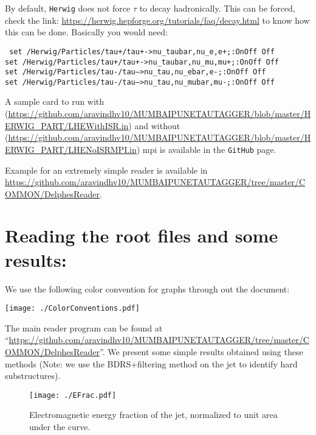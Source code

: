 By default, {\tt Herwig} does not force $\tau$ to decay hadronically. This can be forced, check the link: \url{https://herwig.hepforge.org/tutorials/faq/decay.html} to know how this can be done. Basically you would need:
\begin{center}
    \begin{minipage}{0.8\textwidth}
        {\tt
            set /Herwig/Particles/tau+/tau+->nu\_taubar,nu\_e,e+;:OnOff Off\\
            set /Herwig/Particles/tau+/tau+->nu\_taubar,nu\_mu,mu+;:OnOff Off\\
            set /Herwig/Particles/tau-/tau-->nu\_tau,nu\_ebar,e-;:OnOff Off\\
            set /Herwig/Particles/tau-/tau-->nu\_tau,nu\_mubar,mu-;:OnOff Off
        }
    \end{minipage}
\end{center}

A sample card to run with (\url{https://github.com/aravindhv10/MUMBAIPUNETAUTAGGER/blob/master/HERWIG_PART/LHEWithISR.in}) and without (\url{https://github.com/aravindhv10/MUMBAIPUNETAUTAGGER/blob/master/HERWIG_PART/LHENoISRMPI.in}) mpi is available in the {\tt GitHub} page.

Example for an extremely simple reader is available in \url{https://github.com/aravindhv10/MUMBAIPUNETAUTAGGER/tree/master/COMMON/DelphesReader}.



\section{Reading the root files and some results:}

We use the following color convention for graphs through out the document:
\begin{center}
    \texttt{[image: ./ColorConventions.pdf]}
\end{center}
The main reader program can be found at ``\url{https://github.com/aravindhv10/MUMBAIPUNETAUTAGGER/tree/master/COMMON/DelphesReader}''.
We present some simple results obtained using these methods (Note: we use the BDRS+filtering method on the jet to identify hard substructures).

\begin{figure}
    \begin{center}
        \texttt{[image: ./EFrac.pdf]}
        \caption{ Electromagnetic energy fraction of the jet, normalized to unit area under the curve. }
        \label{fig:EFrac}
    \end{center}
\end{figure}

